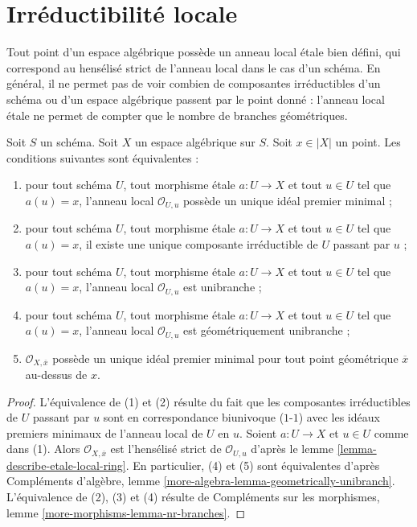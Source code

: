 \section{Irréductibilité locale}
\label{section-irreducible-local-ring}

\noindent
Tout point d'un espace algébrique possède un anneau local \'etale bien défini, qui
correspond au hensélisé strict de l'anneau local dans le cas d'un
schéma. En général, il ne permet pas de voir combien de composantes
irréductibles d'un schéma ou d'un espace algébrique passent par le point donné :
l'anneau local \'etale ne permet de compter que le nombre de branches géométriques.

\begin{lemma}
\label{lemma-irreducible-local-ring}
Soit $S$ un schéma.
Soit $X$ un espace algébrique sur $S$.
Soit $x \in |X|$ un point.
Les conditions suivantes sont équivalentes :
\begin{enumerate}
\item pour tout schéma $U$, tout morphisme \'etale $a : U \to X$ et
tout $u \in U$ tel que $a(u) = x$, l'anneau local $\mathcal{O}_{U, u}$ possède un
unique idéal premier minimal ;
\item pour tout schéma $U$, tout morphisme \'etale $a : U \to X$ et
tout $u \in U$ tel que $a(u) = x$, il existe une unique composante irréductible de $U$
passant par $u$ ;
\item pour tout schéma $U$, tout morphisme \'etale $a : U \to X$ et
tout $u \in U$ tel que $a(u) = x$, l'anneau local $\mathcal{O}_{U, u}$
est unibranche ;
\item pour tout schéma $U$, tout morphisme \'etale $a : U \to X$ et
tout $u \in U$ tel que $a(u) = x$, l'anneau local $\mathcal{O}_{U, u}$
est géométriquement unibranche ;
\item $\mathcal{O}_{X, \overline{x}}$ possède un unique idéal premier minimal
pour tout point géométrique $\overline{x}$ au-dessus de $x$.
\end{enumerate}
\end{lemma}

\begin{proof}
L'équivalence de (1) et (2) résulte du fait que les composantes
irréductibles de $U$ passant par $u$ sont en correspondance biunivoque ($1$-$1$) avec les
idéaux premiers minimaux de l'anneau local de $U$ en $u$. Soient $a : U \to X$ et
$u \in U$ comme dans (1). Alors $\mathcal{O}_{X, \overline{x}}$ est
l'hensélisé strict de $\mathcal{O}_{U, u}$ d'après le
lemme \ref{lemma-describe-etale-local-ring}.
En particulier, (4) et (5) sont équivalentes d'après
Compléments d'algèbre, lemme \ref{more-algebra-lemma-geometrically-unibranch}.
L'équivalence de (2), (3) et (4) résulte de
Compléments sur les morphismes, lemme \ref{more-morphisms-lemma-nr-branches}.
\end{proof}

